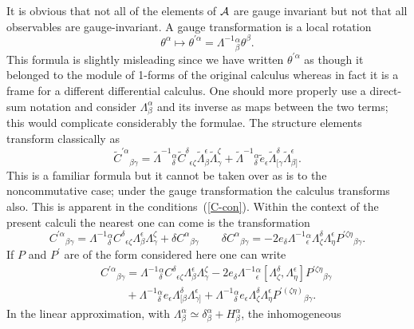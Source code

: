 \documentclass[12pt,a4paper]{article}
\newcounter{eg}
\def\t#1{\tilde #1}
\def\c#1{{\cal #1}}
\begin{document}
It is obvious that not all of the elements of $\c{A}$ are gauge
invariant but not that all observables are gauge-invariant.  A gauge
transformation is a local rotation
\begin{equation}
\theta^\alpha \mapsto \theta^{\prime\alpha} =
\Lambda^{-1}{}^\alpha_\beta \theta^\beta.            \label{lr}
\end{equation}
This formula is slightly misleading since we have written
$\theta^{\prime\alpha}$ as though it belonged to the module of 1-forms
of the original calculus whereas in fact it is a frame for a different
differential calculus. One should more properly use a direct-sum
notation and consider $\Lambda^\alpha_\beta$ and its inverse as maps
between the two terms; this would complicate considerably the formulae.
The structure elements transform classically as
$$
\t{C}^{\prime\alpha}{}_{\beta\gamma} = \t{\Lambda}^{-1}{}^\alpha_\delta
\t{C}^{\delta}{}_{\epsilon\zeta} \t{\Lambda}^\epsilon_\beta
\t{\Lambda}^\zeta_\gamma + 
\t{\Lambda}^{-1}{}^\alpha_\delta \t{e}_\epsilon
\t{\Lambda}^\delta_{[\gamma} \t{\Lambda}^\epsilon_{\beta]}.
$$
This is a familiar formula but it cannot be taken over as is to the
noncommutative case; under the gauge transformation the calculus
transforms also. This is apparent in the conditions~(\ref{C-con}).
Within the context of the present calculi the nearest one can come is
the transformation
$$
C^{\prime\alpha}{}_{\beta\gamma} = \Lambda^{-1}{}^\alpha_\delta
C^{\delta}{}_{\epsilon\zeta} \Lambda^\epsilon_\beta
\Lambda^\zeta_\gamma + \delta C^\alpha{}_{\beta\gamma} \qquad \delta
C^\alpha{}_{\beta\gamma} = - 2e_\delta\Lambda^{-1}{}^\alpha_\epsilon
\Lambda^\delta_\zeta \Lambda^\epsilon_\eta
P^{\prime\zeta\eta}{}_{\beta\gamma}.
$$
If $P$ and $P^\prime$ are of the form considered here one can write
\begin{eqnarray*}
&&C^{\prime\alpha}{}_{\beta\gamma} = \Lambda^{-1}{}^\alpha_\delta
C^{\delta}{}_{\epsilon\zeta} \Lambda^\epsilon_\beta
\Lambda^\zeta_\gamma - 2e_\delta\Lambda^{-1}{}^\alpha_\epsilon
[\Lambda^\delta_\zeta, \Lambda^\epsilon_\eta]
P^{\prime\zeta\eta}{}_{\beta\gamma}\\[6pt]
&&\phantom{C^{\prime\alpha}{}_{\beta\gamma} } +
\Lambda^{-1}{}^\alpha_\delta e_\epsilon \Lambda^\delta_{[\beta}
\Lambda^\epsilon_{\gamma]} + \Lambda^{-1}{}^\alpha_\delta e_\epsilon
\Lambda^\delta_\zeta \Lambda^\epsilon_\eta
P^{\prime(\zeta\eta)}{}_{\beta\gamma}.
\end{eqnarray*}
In the linear approximation, with $\Lambda^\alpha_\beta \simeq
\delta^\alpha_\beta + H^\alpha_\beta$, the inhomogeneous
\end{document}
